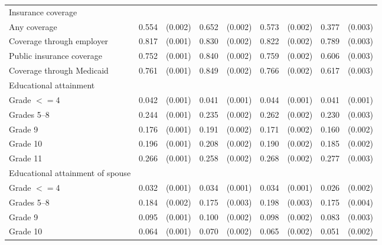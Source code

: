 \begin{tabular}{lcccccccc}
 Insurance coverage   & & & & & \\
 \hspace{0.3cm}  Any coverage   & 0.554 & (0.002)  & 0.652 & (0.002)  & 0.573 & (0.002)  & 0.377 & (0.003)  \\
 \hspace{0.3cm}  Coverage through employer   & 0.817 & (0.001)  & 0.830 & (0.002)  & 0.822 & (0.002)  & 0.789 & (0.003)  \\
 \hspace{0.3cm}  Public insurance coverage   & 0.752 & (0.001)  & 0.840 & (0.002)  & 0.759 & (0.002)  & 0.606 & (0.003)  \\
 \hspace{0.3cm}  Coverage through Medicaid   & 0.761 & (0.001)  & 0.849 & (0.002)  & 0.766 & (0.002)  & 0.617 & (0.003)  \\
 Educational attainment   & & & & & \\
 \hspace{0.3cm} Grade $<=$4   & 0.042 & (0.001)  & 0.041 & (0.001)  & 0.044 & (0.001)  & 0.041 & (0.001)  \\
 \hspace{0.3cm}  Grades 5--8   & 0.244 & (0.001)  & 0.235 & (0.002)  & 0.262 & (0.002)  & 0.230 & (0.003)  \\
 \hspace{0.3cm} Grade 9   & 0.176 & (0.001)  & 0.191 & (0.002)  & 0.171 & (0.002)  & 0.160 & (0.002)  \\
 \hspace{0.3cm} Grade 10   & 0.196 & (0.001)  & 0.208 & (0.002)  & 0.190 & (0.002)  & 0.185 & (0.002)  \\
 \hspace{0.3cm} Grade 11   & 0.266 & (0.001)  & 0.258 & (0.002)  & 0.268 & (0.002)  & 0.277 & (0.003)  \\
 Educational attainment of spouse   & & & & & \\
 \hspace{0.3cm} Grade $<=$4   & 0.032 & (0.001)  & 0.034 & (0.001)  & 0.034 & (0.001)  & 0.026 & (0.002)  \\
 \hspace{0.3cm}  Grades 5--8   & 0.184 & (0.002)  & 0.175 & (0.003)  & 0.198 & (0.003)  & 0.175 & (0.004)  \\
 \hspace{0.3cm} Grade 9   & 0.095 & (0.001)  & 0.100 & (0.002)  & 0.098 & (0.002)  & 0.083 & (0.003)  \\
 \hspace{0.3cm} Grade 10   & 0.064 & (0.001)  & 0.070 & (0.002)  & 0.065 & (0.002)  & 0.051 & (0.002)  \\

\end{tabular}
